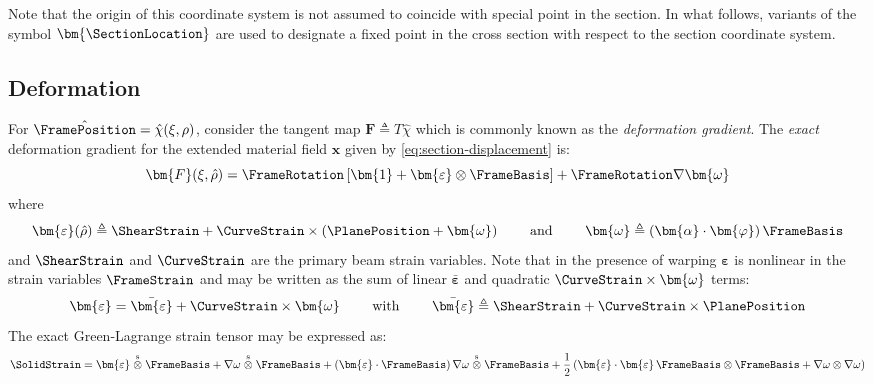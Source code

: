 Note that the origin of this coordinate system is not assumed to coincide with special point in the section. In what follows, variants of the symbol \(\bm{\SectionLocation}\) are used to designate a fixed point in the cross section with respect to the section coordinate system. 
%


\subsection{Deformation}

For \(\hat{\FramePosition} = \hat{\chi}(\xi,\rho)\), consider the tangent map \(\bm{F} \triangleq T\hat{\chi}\) which is commonly known as the \emph{deformation gradient}.
%
The \emph{exact} deformation gradient for the extended material field $\hat{\bm{x}}$ given by \cref{eq:section-displacement} is:
$$
\bm{F}(\xi, \hat{\rho}) 
= \FrameRotation\left[\bm{1} + \bm{\varepsilon}\otimes\FrameBasis\right] + \FrameRotation\nabla \bm{\omega}
$$
where
$$
\bm{\varepsilon}(\hat{\rho}) \triangleq\ShearStrain  + \CurveStrain  \times (\PlanePosition  + \bm{\omega})
\qquad\text{ and }\qquad
\bm{\omega} \triangleq (\bm{\alpha}\cdot\bm{\varphi})\, \FrameBasis
$$
and $\ShearStrain $ and $\CurveStrain $ are the primary beam strain variables.
Note that in the presence of warping $\bm{\varepsilon}$ is nonlinear in
the strain variables $\FrameStrain$ and may be written as the sum of linear $\bar{\bm{\varepsilon}}$ and quadratic $\CurveStrain \times\bm{\omega}$ terms:
$$
\bm{\varepsilon} = \bar{\bm{\varepsilon}} + \CurveStrain \times\bm{\omega}
\qquad\text{ with }\qquad
\bar{\bm{\varepsilon}} \triangleq \ShearStrain  + \CurveStrain \times\PlanePosition 
$$
%
The exact Green-Lagrange strain tensor may be expressed as:
\begin{equation}
\SolidStrain = \bm{\varepsilon}
\stackrel{\mathrm{s}}{\otimes}
\FrameBasis 
+\nabla\omega \stackrel{\mathrm{s}}{\otimes} \FrameBasis
+({\bm{\varepsilon}}\cdot\FrameBasis)\,\nabla\omega \stackrel{\mathrm{s}}{\otimes} \FrameBasis
+ \frac{1}{2}\left(
  \bm{\varepsilon}\cdot\bm{\varepsilon}\,\FrameBasis\otimes\FrameBasis
+ \nabla\omega\otimes\nabla\omega
\right)
\label{eq:exact-gl-strain}
\end{equation}

